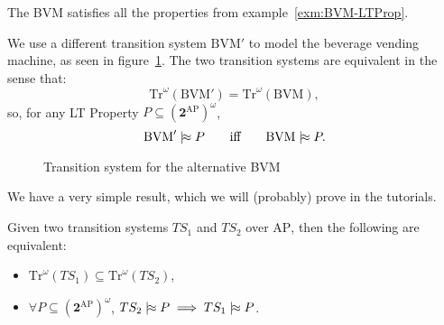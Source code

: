 \documentclass[./main]{subfiles}
\begin{document}
  \begin{en-exm}
    The BVM satisfies all the properties from example~\ref{exm:BVM-LTProp}.
  \end{en-exm}

  \begin{en-exm}
    We use a different transition system $\mathrm{BVM}'$ to model the beverage vending machine, as seen in figure~\ref{fig:bvm'-ts-label}.
    The two transition systems are equivalent in the sense that:
    \[
    \mathrm{Tr}^\omega(\mathrm{BVM}') = \mathrm{Tr}^\omega(\mathrm{BVM})
    ,\] so, for any LT Property $P \subseteq (\mathbf{2}^\mathrm{AP})^\omega$,
    \[
    \mathrm{BVM}' \mathrel{{|}\!{\approx}} P \quad\quad\text{iff} \quad\quad \mathrm{BVM} \mathrel{{|}\!{\approx}} P
    .\]
  \end{en-exm}

  \begin{figure}
    \centering
    \caption{Transition system for the alternative BVM}
    \label{fig:bvm'-ts-label}
  \end{figure}

  We have a very simple result, which we will (probably) prove in the tutorials.

  \begin{en-prop}
    Given two transition systems $TS_1$ and $TS_2$ over $\mathrm{AP}$, then the following are equivalent:
    \begin{itemize}
      \item $\mathrm{Tr}^\omega(TS_1) \subseteq \mathrm{Tr}^\omega(TS_2)$,
      \item $\forall P \subseteq (\mathbf{2}^\mathrm{AP})^\omega$, $TS_2 \mathrel{{|}\!{\approx}} P \implies TS_1 \mathrel{{|}\!{\approx}} P$.
    \end{itemize}
  \end{en-prop}
\end{document}
